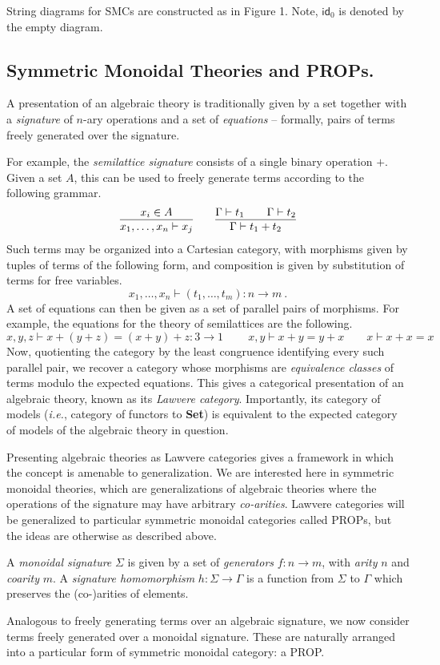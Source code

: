 String diagrams for {SMCs} are constructed as in Figure 1. Note, $\textsf{id}_0$ is denoted by the empty diagram. 


\subsection{Symmetric Monoidal Theories and PROPs. }

A presentation of an algebraic theory is traditionally given by a set together with a \textit{signature} of $n$-ary operations and a set of \textit{equations} -- formally,  pairs of terms freely generated over the signature.  

For example, the \textit{semilattice signature} consists of a single binary operation $+$.  Given a set $A$, this can be used to freely generate terms according to the following grammar.
\begin{align*}
	\infer{x_1, \ldots, x_n \vdash x_j}{x_i \in A} \qquad \infer{\Gamma \vdash t_1 + t_2}{\Gamma \vdash t_1 && \Gamma \vdash t_2} 
\end{align*}
Such terms may be organized into a Cartesian category, with morphisms given by tuples of terms of the following form,  and composition is given by substitution of terms for free variables.  
\[
	x_1, \ldots, x_n \vdash (t_1, \ldots, t_m) : n \to m\ .
\]
A set of equations can then be given as a set of parallel pairs of morphisms.  
For example, the equations for the theory of semilattices are the following.
\[
	x,y,z \vdash x+(y+z) = (x+y)+z : 3 \to 1\ \qquad  
    x,y \vdash x+y = y+x \qquad 
    x \vdash x+x = x
\]
Now, quotienting the category by the least congruence identifying every such parallel pair, we recover a category whose morphisms are \textit{equivalence classes} of terms modulo the expected equations. 
This gives a categorical presentation of an algebraic theory, known as its \textit{Lawvere category}. 
Importantly,  its category of models (\textit{i.e.}, category of functors to \textbf{Set}) is equivalent to the expected category of models of the algebraic theory in question.  

Presenting algebraic theories as Lawvere categories gives a framework in which the concept is amenable to generalization.  We are interested here in symmetric monoidal theories, which are generalizations of algebraic theories where the operations of the signature may have arbitrary \textit{co-arities}.  Lawvere categories will be generalized to particular symmetric monoidal categories called PROPs, but the ideas are otherwise as described above. 
\begin{definition}
A \textit{monoidal signature} $\Sigma$ is given by a set of \textit{generators} $f: n \to m$,  with \textit{arity} $n$ and \textit{coarity} $m$.  A \textit{signature homomorphism} $h: \Sigma \to \Gamma$ is a function from $\Sigma$ to $\Gamma$ which preserves the (co-)arities of elements. 
\end{definition}
Analogous to freely generating terms over an algebraic signature,  we now consider terms freely generated over a monoidal signature.  These are naturally arranged into a particular form of symmetric monoidal category: a PROP. 

